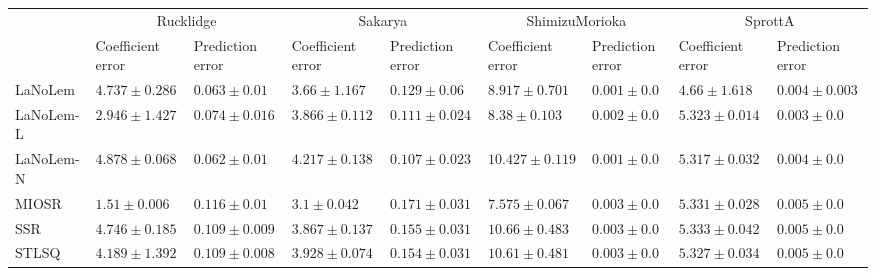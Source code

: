 \begin{table*}
{\begin{tabular}{lllllllll}
 & \multicolumn{2}{c}{Rucklidge} & \multicolumn{2}{c}{Sakarya} & \multicolumn{2}{c}{ShimizuMorioka} & \multicolumn{2}{c}{SprottA} \\
 & Coefficient error & Prediction error & Coefficient error & Prediction error & Coefficient error & Prediction error & Coefficient error & Prediction error \\
\midrule
LaNoLem & $4.737\pm 0.286$ & $0.063\pm 0.01$ & $3.66\pm 1.167$ & $0.129\pm 0.06$ & $8.917\pm 0.701$ & $0.001\pm 0.0$ & $\mathbf{4.66}\pm 1.618$ & $0.004\pm 0.003$ \\
LaNoLem-L & $2.946\pm 1.427$ & $0.074\pm 0.016$ & $3.866\pm 0.112$ & $0.111\pm 0.024$ & $8.38\pm 0.103$ & $0.002\pm 0.0$ & $5.323\pm 0.014$ & $\mathbf{0.003}\pm 0.0$ \\
LaNoLem-N & $4.878\pm 0.068$ & $\mathbf{0.062}\pm 0.01$ & $4.217\pm 0.138$ & $\mathbf{0.107}\pm 0.023$ & $10.427\pm 0.119$ & $\mathbf{0.001}\pm 0.0$ & $5.317\pm 0.032$ & $0.004\pm 0.0$ \\
MIOSR & $\mathbf{1.51}\pm 0.006$ & $0.116\pm 0.01$ & $\mathbf{3.1}\pm 0.042$ & $0.171\pm 0.031$ & $\mathbf{7.575}\pm 0.067$ & $0.003\pm 0.0$ & $5.331\pm 0.028$ & $0.005\pm 0.0$ \\
SSR & $4.746\pm 0.185$ & $0.109\pm 0.009$ & $3.867\pm 0.137$ & $0.155\pm 0.031$ & $10.66\pm 0.483$ & $0.003\pm 0.0$ & $5.333\pm 0.042$ & $0.005\pm 0.0$ \\
STLSQ & $4.189\pm 1.392$ & $0.109\pm 0.008$ & $3.928\pm 0.074$ & $0.154\pm 0.031$ & $10.61\pm 0.481$ & $0.003\pm 0.0$ & $5.327\pm 0.034$ & $0.005\pm 0.0$ \\

\midrule


\end{tabular}}
\end{table*}
